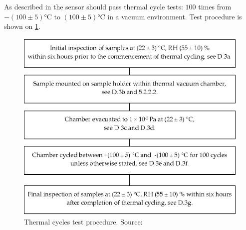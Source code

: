        As described in \cite{ECSS_Q_ST_70_04C} the sensor should pass thermal cycle tests: $100$ times from $- (100 \pm 5)$\si{\degreeCelsius} to $(100 \pm 5)$\si{\degreeCelsius} in a vacuum environment. Test procedure is shown on \ref{thermal_tests}.

        \begin{figure}[H]
            \centering
            \includegraphics[width=0.5\paperwidth]{img/04/thermal_cycles.eps}
            \caption{Thermal cycles test procedure. Source: \cite{ECSS_Q_ST_70_04C}}
            \label{thermal_tests}
        \end{figure}
